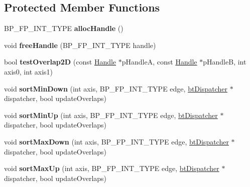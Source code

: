 \subsection*{Protected Member Functions}
\begin{DoxyCompactItemize}
\item 
\hypertarget{classbt_axis_sweep3_internal_a40b3512ebfeefbec480a906328053988}{B\+P\+\_\+\+F\+P\+\_\+\+I\+N\+T\+\_\+\+T\+Y\+P\+E {\bfseries alloc\+Handle} ()}\label{classbt_axis_sweep3_internal_a40b3512ebfeefbec480a906328053988}

\item 
\hypertarget{classbt_axis_sweep3_internal_ac40f411fe4911c17c681d47656296b26}{void {\bfseries free\+Handle} (B\+P\+\_\+\+F\+P\+\_\+\+I\+N\+T\+\_\+\+T\+Y\+P\+E handle)}\label{classbt_axis_sweep3_internal_ac40f411fe4911c17c681d47656296b26}

\item 
\hypertarget{classbt_axis_sweep3_internal_a49abf8db2723c3ec699031539ab6e06d}{bool {\bfseries test\+Overlap2\+D} (const \hyperlink{classbt_axis_sweep3_internal_1_1_handle}{Handle} $\ast$p\+Handle\+A, const \hyperlink{classbt_axis_sweep3_internal_1_1_handle}{Handle} $\ast$p\+Handle\+B, int axis0, int axis1)}\label{classbt_axis_sweep3_internal_a49abf8db2723c3ec699031539ab6e06d}

\item 
\hypertarget{classbt_axis_sweep3_internal_ac12a6524d4fe2b30f084be1c556e8087}{void {\bfseries sort\+Min\+Down} (int axis, B\+P\+\_\+\+F\+P\+\_\+\+I\+N\+T\+\_\+\+T\+Y\+P\+E edge, \hyperlink{classbt_dispatcher}{bt\+Dispatcher} $\ast$dispatcher, bool update\+Overlaps)}\label{classbt_axis_sweep3_internal_ac12a6524d4fe2b30f084be1c556e8087}

\item 
\hypertarget{classbt_axis_sweep3_internal_ae2547559962876e0da7899dadca7f9aa}{void {\bfseries sort\+Min\+Up} (int axis, B\+P\+\_\+\+F\+P\+\_\+\+I\+N\+T\+\_\+\+T\+Y\+P\+E edge, \hyperlink{classbt_dispatcher}{bt\+Dispatcher} $\ast$dispatcher, bool update\+Overlaps)}\label{classbt_axis_sweep3_internal_ae2547559962876e0da7899dadca7f9aa}

\item 
\hypertarget{classbt_axis_sweep3_internal_a345b7d853ad2a2449da0b51b1f35ff49}{void {\bfseries sort\+Max\+Down} (int axis, B\+P\+\_\+\+F\+P\+\_\+\+I\+N\+T\+\_\+\+T\+Y\+P\+E edge, \hyperlink{classbt_dispatcher}{bt\+Dispatcher} $\ast$dispatcher, bool update\+Overlaps)}\label{classbt_axis_sweep3_internal_a345b7d853ad2a2449da0b51b1f35ff49}

\item 
\hypertarget{classbt_axis_sweep3_internal_af8e014dfdce82a2d16dde9cb342fa58f}{void {\bfseries sort\+Max\+Up} (int axis, B\+P\+\_\+\+F\+P\+\_\+\+I\+N\+T\+\_\+\+T\+Y\+P\+E edge, \hyperlink{classbt_dispatcher}{bt\+Dispatcher} $\ast$dispatcher, bool update\+Overlaps)}\label{classbt_axis_sweep3_internal_af8e014dfdce82a2d16dde9cb342fa58f}

\end{DoxyCompactItemize}
